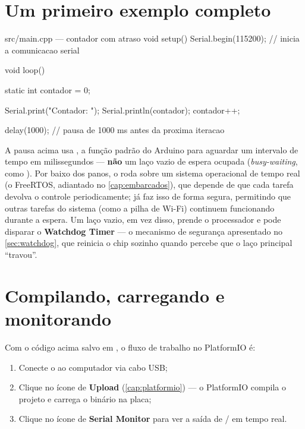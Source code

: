 \section{Um primeiro exemplo completo}

\begin{codigoc}{src/main.cpp — contador com atraso}
void setup() {
    Serial.begin(115200);   // inicia a comunicacao serial
}

void loop() {
    static int contador = 0;

    Serial.print("Contador: ");
    Serial.println(contador);
    contador++;

    delay(1000);   // pausa de 1000 ms antes da proxima iteracao
}
\end{codigoc}

\begin{atencao}
A pausa acima usa , a função padrão do Arduino para aguardar um intervalo de tempo em milissegundos — \textbf{não} um laço vazio de espera ocupada (\emph{busy-waiting}, como ). Por baixo dos panos, o \ESP{} roda sobre um sistema operacional de tempo real (o FreeRTOS, adiantado no \cref{cap:embarcados}), que depende de que cada tarefa devolva o controle periodicamente;  já faz isso de forma segura, permitindo que outras tarefas do sistema (como a pilha de Wi-Fi) continuem funcionando durante a espera. Um laço vazio, em vez disso, prende o processador e pode disparar o \textbf{Watchdog Timer} — o mecanismo de segurança apresentado no \cref{sec:watchdog}, que reinicia o chip sozinho quando percebe que o laço principal ``travou''.
\end{atencao}

\section{Compilando, carregando e monitorando}

Com o código acima salvo em , o fluxo de trabalho no PlatformIO é:

\begin{enumerate}
    \item Conecte o \ESP{} ao computador via cabo USB;
    \item Clique no ícone de \textbf{Upload} (\cref{cap:platformio}) — o PlatformIO compila o projeto e carrega o binário na placa;
    \item Clique no ícone de \textbf{Serial Monitor} para ver a saída de / em tempo real.
\end{enumerate}

